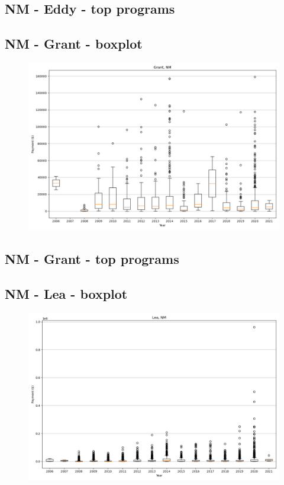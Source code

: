 \subsection*{NM - Eddy - top programs}

\newpage
\subsection*{NM - Grant - boxplot}
\begin{figure}[h]
\centering
\includegraphics[width=7in]{../output/boxplots/counties/Grant-NM_boxplot.png}
\end{figure}


\subsection*{NM - Grant - top programs}

\newpage
\subsection*{NM - Lea - boxplot}
\begin{figure}[h]
\centering
\includegraphics[width=7in]{../output/boxplots/counties/Lea-NM_boxplot.png}
\end{figure}


